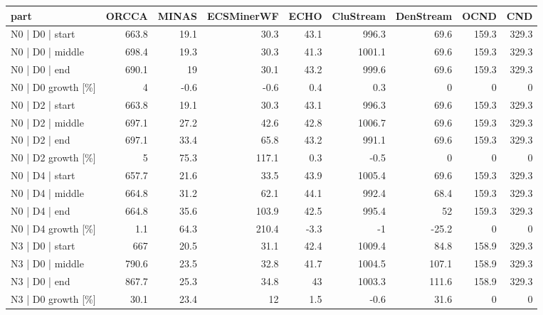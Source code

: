 \begin{tabular}{lrrrrrrrr}
\hline
 part               &   ORCCA &   MINAS &   ECSMinerWF &   ECHO &   CluStream &   DenStream &   OCND &   CND \\
\hline
 N0 | D0 | start    &   663.8 &    19.1 &         30.3 &   43.1 &       996.3 &        69.6 &  159.3 & 329.3 \\
 N0 | D0 | middle   &   698.4 &    19.3 &         30.3 &   41.3 &      1001.1 &        69.6 &  159.3 & 329.3 \\
 N0 | D0 | end      &   690.1 &    19   &         30.1 &   43.2 &       999.6 &        69.6 &  159.3 & 329.3 \\
 N0 | D0 growth [\%] &     4   &    -0.6 &         -0.6 &    0.4 &         0.3 &         0   &    0   &   0   \\
 N0 | D2 | start    &   663.8 &    19.1 &         30.3 &   43.1 &       996.3 &        69.6 &  159.3 & 329.3 \\
 N0 | D2 | middle   &   697.1 &    27.2 &         42.6 &   42.8 &      1006.7 &        69.6 &  159.3 & 329.3 \\
 N0 | D2 | end      &   697.1 &    33.4 &         65.8 &   43.2 &       991.1 &        69.6 &  159.3 & 329.3 \\
 N0 | D2 growth [\%] &     5   &    75.3 &        117.1 &    0.3 &        -0.5 &         0   &    0   &   0   \\
 N0 | D4 | start    &   657.7 &    21.6 &         33.5 &   43.9 &      1005.4 &        69.6 &  159.3 & 329.3 \\
 N0 | D4 | middle   &   664.8 &    31.2 &         62.1 &   44.1 &       992.4 &        68.4 &  159.3 & 329.3 \\
 N0 | D4 | end      &   664.8 &    35.6 &        103.9 &   42.5 &       995.4 &        52   &  159.3 & 329.3 \\
 N0 | D4 growth [\%] &     1.1 &    64.3 &        210.4 &   -3.3 &        -1   &       -25.2 &    0   &   0   \\
 N3 | D0 | start    &   667   &    20.5 &         31.1 &   42.4 &      1009.4 &        84.8 &  158.9 & 329.3 \\
 N3 | D0 | middle   &   790.6 &    23.5 &         32.8 &   41.7 &      1004.5 &       107.1 &  158.9 & 329.3 \\
 N3 | D0 | end      &   867.7 &    25.3 &         34.8 &   43   &      1003.3 &       111.6 &  158.9 & 329.3 \\
 N3 | D0 growth [\%] &    30.1 &    23.4 &         12   &    1.5 &        -0.6 &        31.6 &    0   &   0   \\

\end{tabular}
